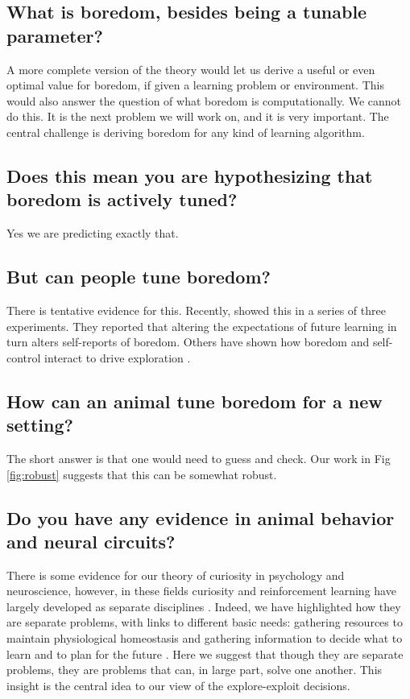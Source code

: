 \subsection*{What is boredom, besides being a tunable parameter?}
A more complete version of the theory would let us derive a useful or even optimal value for boredom, if given a learning problem or environment. This would also answer the question of what boredom is computationally. We cannot do this. It is the next problem we will work on, and it is very important. The central challenge is deriving boredom for any kind of learning algorithm.


\subsection*{Does this mean you are hypothesizing that boredom is actively tuned?}
Yes we are predicting exactly that.


\subsection*{But can people tune boredom?}
There is tentative evidence for this. Recently, \cite{Geana2016} showed this in a series of three experiments. They reported that altering the expectations of future learning in turn alters self-reports of boredom. Others have shown how boredom and self-control interact to drive exploration \cite{Hill1985,Bench2013a,Wolff2020a}.


\subsection*{How can an animal tune boredom for a new setting?}
The short answer is that one would need to guess and check. Our work in Fig \ref{fig:robust} suggests that this can be somewhat robust.


\subsection*{Do you have any evidence in animal behavior and neural circuits?}
There is some evidence for our theory of curiosity in psychology and neuroscience, however, in these fields curiosity and reinforcement learning have largely developed as separate disciplines \cite{Berlyne1950,Kidd2015,Sutton2018}. Indeed, we have highlighted how they are separate problems, with links to different basic needs: gathering resources to maintain physiological homeostasis \cite{Keramati2014,Juechems2019} and gathering information to decide what to learn and to plan for the future \cite{Valiant1984,Sutton2018}. Here we suggest that though they are separate problems, they are problems that can, in large part, solve one another. This insight is the central idea to our view of the explore-exploit decisions. 

